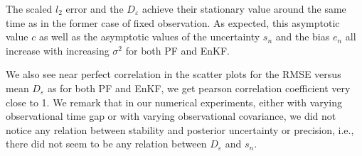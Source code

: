 The scaled $l_2$ error and the $D_\varepsilon$ achieve their stationary value around the same time as in the former case of fixed observation. As expected, this asymptotic value $c$ as well as the asymptotic values of the uncertainty $s_n$ and the bias $e_n$ all increase with increasing $\sigma^2$ for both PF and EnKF.  

We also see near perfect correlation in the scatter plots for the RMSE versus mean $D_\varepsilon$ as for both PF and EnKF, we get pearson correlation coefficient very close to 1. We remark that in our numerical experiments, either with varying observational time gap or with varying observational covariance, we did not notice any relation between stability and posterior uncertainty or precision, i.e., there did not seem to be any relation between $D_\varepsilon$ and $s_n$.

